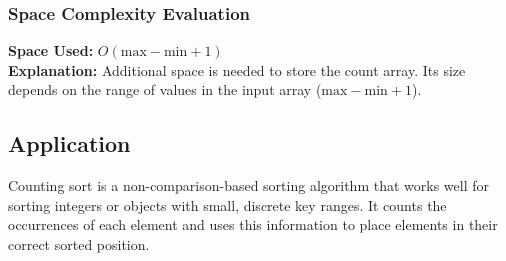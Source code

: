 \subsubsection{Space Complexity Evaluation}
\textbf{Space Used:} \(O(\text{max} - \text{min} + 1)\) \\
\textbf{Explanation:} Additional space is needed to store the count array. Its size depends on the range of values in the input array (\(\text{max} - \text{min} + 1\)).

\subsection{Application}
Counting sort is a non-comparison-based sorting algorithm that works well for sorting integers or objects with small, discrete key ranges. It counts the occurrences of each element and uses this information to place elements in their correct sorted position.
